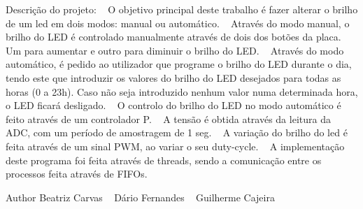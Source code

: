 Descrição do projeto\+: ~\newline
O objetivo principal deste trabalho é fazer alterar o brilho de um led em dois modos\+: manual ou automático. ~\newline
Através do modo manual, o brilho do L\+ED é controlado manualmente através de dois dos botões da placa. Um para aumentar e outro para diminuir o brilho do L\+ED. ~\newline
Através do modo automático, é pedido ao utilizador que programe o brilho do L\+ED durante o dia, tendo este que introduzir os valores do brilho do L\+ED desejados para todas as horas (0 a 23h). Caso não seja introduzido nenhum valor numa determinada hora, o L\+ED ficará desligado. ~\newline
O controlo do brilho do L\+ED no modo automático é feito através de um controlador P. ~\newline
A tensão é obtida através da leitura da A\+DC, com um período de amostragem de 1 seg. ~\newline
A variação do brilho do led é feita através de um sinal P\+WM, ao variar o seu duty-\/cycle. ~\newline
A implementação deste programa foi feita através de threads, sendo a comunicação entre os processos feita através de F\+I\+F\+Os.\begin{DoxyAuthor}{Author}
Beatriz Carvas ~\newline
 Dário Fernandes ~\newline
 Guilherme Cajeira 
\end{DoxyAuthor}
